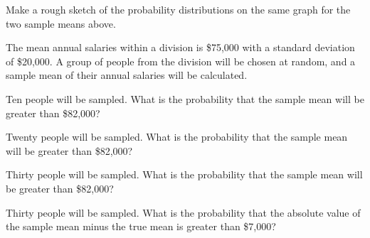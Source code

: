 \begin{problem}
\begin{subproblem}
      \vfill

    \item Make a rough sketch of the probability distributions on the
      same graph for the two sample means above.

      \vfill

  \end{subproblem}

\clearpage

  \item The mean annual salaries within a division is \$75,000 with a
    standard deviation of \$20,000. A group of people from the
    division will be chosen at random, and a sample mean of their
    annual salaries will be calculated.
  \begin{subproblem}
    \item Ten people will be sampled. What is the probability that the
      sample mean will be greater than \$82,000?

      \vfill

    \item Twenty people will be sampled. What is the probability that the
      sample mean will be greater than \$82,000?

      \vfill

    \item Thirty people will be sampled. What is the probability that
      the sample mean will be greater than \$82,000?

      \vfill

    \item Thirty people will be sampled. What is the probability that
      the absolute value of the sample mean minus the true mean is
      greater than \$7,000?

      \vfill

  \end{subproblem}


\end{problem}


